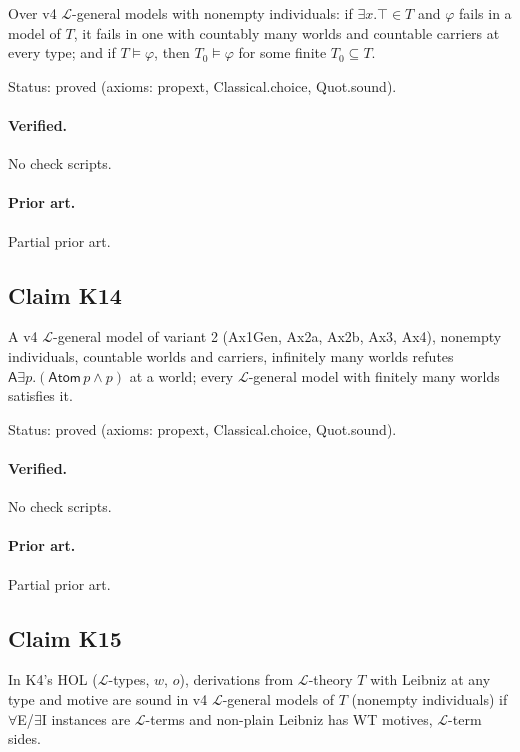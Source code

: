 \documentclass{article}
\begin{document}
Over v4 $\mathcal L$-general models with nonempty individuals: if $\exists x.\top\in T$ and $\varphi$ fails in a model of $T$, it fails in one with countably many worlds and countable carriers at every type; and if $T\models\varphi$, then $T_0\models\varphi$ for some finite $T_0\subseteq T$.

Status: proved (axioms: propext, Classical.choice, Quot.sound).

\paragraph{Verified.}
No check scripts.

\paragraph{Prior art.} Partial prior art.

\subsection*{Claim K14}

A v4 $\mathcal L$-general model of variant 2 (Ax1Gen, Ax2a, Ax2b, Ax3, Ax4), nonempty individuals, countable worlds and carriers, infinitely many worlds refutes $\mathsf A\exists p.(\mathsf{Atom}\,p\wedge p)$ at a world; every $\mathcal L$-general model with finitely many worlds satisfies it.

Status: proved (axioms: propext, Classical.choice, Quot.sound).

\paragraph{Verified.}
No check scripts.

\paragraph{Prior art.} Partial prior art.

\subsection*{Claim K15}

In K4's HOL ($\mathcal L$-types, $w$, $o$), derivations from $\mathcal L$-theory $T$ with Leibniz at any type and motive are sound in v4 $\mathcal L$-general models of $T$ (nonempty individuals) if $\forall$E/$\exists$I instances are $\mathcal L$-terms and non-plain Leibniz has WT motives, $\mathcal L$-term sides.
\end{document}

